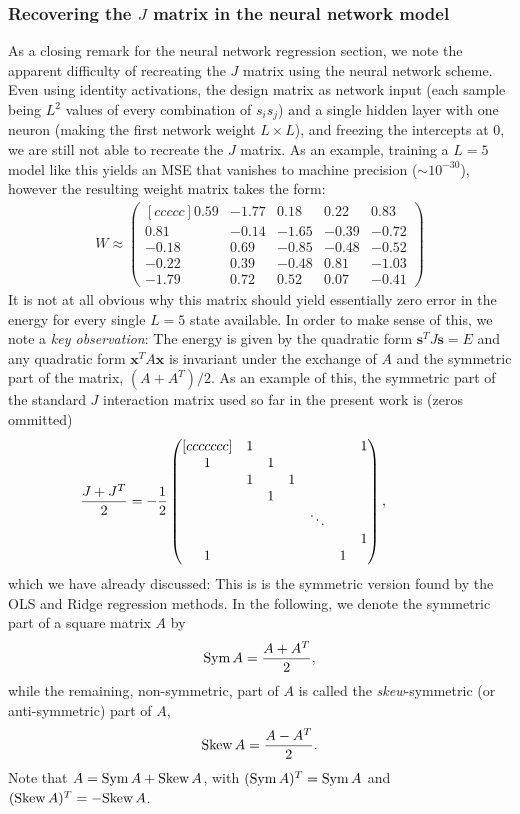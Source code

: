 \documentclass[a4paper, twocolumn]{article}
\newcommand{\pmat}[2]{\begin{pmatrix}[#1] #2 \end{pmatrix}}  %
\begin{document}
\subsubsection{Recovering the $J$ matrix in the neural network model}
As a closing remark for the neural network regression section, we note the apparent difficulty of recreating the $J$ matrix using the neural network scheme. Even using identity activations, the design matrix as network input (each sample being $L^2$ values of every combination of $s_is_j$) and a single hidden layer with one neuron (making the first network weight $L\times L$), and freezing the intercepts at $0$, we are still not able to recreate the $J$ matrix. As an example, training a $L=5$ model like this yields an MSE that vanishes to machine precision ($\sim10^{-30}$), however the resulting weight matrix takes the form:
\begin{align}
W\approx
\pmat{ccccc}{
 0.59 & -1.77 &  0.18 &  0.22 &  0.83 \\
 0.81 & -0.14 & -1.65 & -0.39 & -0.72 \\
-0.18 &  0.69 & -0.85 & -0.48 & -0.52 \\
-0.22 &  0.39 & -0.48 &  0.81 & -1.03 \\
-1.79 &  0.72 &  0.52 &  0.07 & -0.41
} \nonumber
\end{align}
It is not at all obvious why this matrix should yield essentially zero error in the energy for every single $L=5$ state available. In order to make sense of this, we note a \textit{key observation}: The energy is given by the quadratic form $\mathbf{s}^TJ\mathbf{s}=E$ and any quadratic form $\mathbf{x}^TA\mathbf{x}$ is invariant under the exchange of $A$ and the symmetric part of the matrix, $(A+A^T)/2$. As an example of this, the symmetric part of the standard $J$ interaction matrix used so far in the present work is (zeros ommitted)
\begin{align}
\hspace{-1cm}\frac{J+J^T}{2}&=-\frac{1}{2}\pmat{ccccccc}{
   & 1 &   &   &   &   &  1\\
 1 &   & 1 &   &   &   &   \\
   & 1 &   & 1 &   &   &   \\
   &   & 1 &   &   &   &   \\
   &   &   &   & \ddots & & \\
   &   &   &   &   &   & 1 \\
 1 &   &   &   &   & 1 &  
},\label{eq:symj}
\end{align}
which we have already discussed: This is is the symmetric version found by the OLS and Ridge regression methods. In the following, we denote the symmetric part of a square matrix $A$ by
\begin{align}
\text{Sym}\, A=\frac{A+A^T}{2},
\end{align}
while the remaining, non-symmetric, part of $A$ is called the \textit{skew}-symmetric (or anti-symmetric) part of $A$,
\begin{align}
\text{Skew}\, A=\frac{A-A^T}{2}.
\end{align}
Note that $A=\text{Sym}\, A+\text{Skew}\, A$, with $(\text{Sym}\, A)^T=\text{Sym}\, A$ and $(\text{Skew}\, A)^T=-\text{Skew}\, A$.
\end{document}
